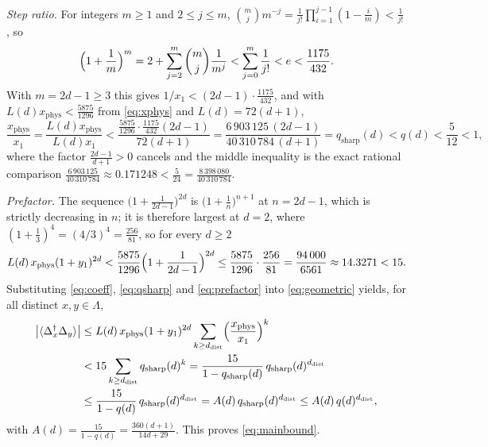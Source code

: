 \documentclass[11pt]{article}
\theoremstyle{plain}
\theoremstyle{definition}
\newcommand{\Dop}{\Delta}
\begin{document}
\emph{Step ratio.} For integers $m\ge1$ and $2\le j\le m$,
$\binom mj m^{-j}=\frac1{j!}\prod_{i=1}^{j-1}(1-\frac im)<\frac1{j!}$, so
\begin{equation}\label{eq:elev}
 \Bigl(1+\frac1m\Bigr)^m=2+\sum_{j=2}^m\binom mj\frac1{m^j}
 <\sum_{j=0}^m\frac1{j!}<e<\frac{1175}{432}.
\end{equation}
With $m=2d-1\ge3$ this gives $1/x_1<(2d-1)\cdot\frac{1175}{432}$, and with
$L(d)x_{\mathrm{phys}}<\frac{5875}{1296}$ from \eqref{eq:xphys} and
$L(d)=72(d+1)$,
\begin{equation}\label{eq:qsharp}
 \frac{x_{\mathrm{phys}}}{x_1}
 =\frac{L(d)x_{\mathrm{phys}}}{L(d)x_1}
 <\frac{\frac{5875}{1296}\cdot\frac{1175}{432}(2d-1)}{72(d+1)}
 =\frac{6\,903\,125\,(2d-1)}{40\,310\,784\,(d+1)}
 =q_{\mathrm{sharp}}(d)<q(d)<\frac5{12}<1,
\end{equation}
where the factor $\frac{2d-1}{d+1}>0$ cancels and the middle inequality is the
exact rational comparison
$\frac{6\,903\,125}{40\,310\,784}\approx0.171248<\frac5{24}
=\frac{8\,398\,080}{40\,310\,784}$.

\emph{Prefactor.} The sequence $\bigl(1+\frac1{2d-1}\bigr)^{2d}$ is
$\bigl(1+\frac1n\bigr)^{n+1}$ at $n=2d-1$, which is strictly decreasing in $n$;
it is therefore largest at $d=2$, where
$(1+\frac13)^4=(4/3)^4=\frac{256}{81}$, so for every $d\ge2$
\begin{equation}\label{eq:prefactor}
 L(d)\,x_{\mathrm{phys}}(1+y_1)^{2d}
 <\frac{5875}{1296}\Bigl(1+\frac1{2d-1}\Bigr)^{2d}
 \le\frac{5875}{1296}\cdot\frac{256}{81}=\frac{94\,000}{6561}\approx14.3271<15 .
\end{equation}
Substituting \eqref{eq:coeff}, \eqref{eq:qsharp} and \eqref{eq:prefactor} into
\eqref{eq:geometric} yields, for all distinct $x,y\in\Lambda$,
\begin{align}
 \bigl|\langle\Dop_x^\dagger\Dop_y\rangle\bigr|
 &\le L(d)\,x_{\mathrm{phys}}(1+y_1)^{2d}\sum_{k\ge d_{\mathrm{dist}}}
 \Bigl(\frac{x_{\mathrm{phys}}}{x_1}\Bigr)^{k}\notag\\
 &<15\sum_{k\ge d_{\mathrm{dist}}}q_{\mathrm{sharp}}(d)^{k}
 =\frac{15}{1-q_{\mathrm{sharp}}(d)}\,q_{\mathrm{sharp}}(d)^{d_{\mathrm{dist}}}\notag\\
 &\le\frac{15}{1-q(d)}\,q_{\mathrm{sharp}}(d)^{d_{\mathrm{dist}}}
 =A(d)\,q_{\mathrm{sharp}}(d)^{d_{\mathrm{dist}}}\le A(d)\,q(d)^{d_{\mathrm{dist}}},
 \label{eq:decay}
\end{align}
with $A(d)=\frac{15}{1-q(d)}=\frac{360(d+1)}{14d+29}$. This proves
\eqref{eq:mainbound}.
\end{document}
